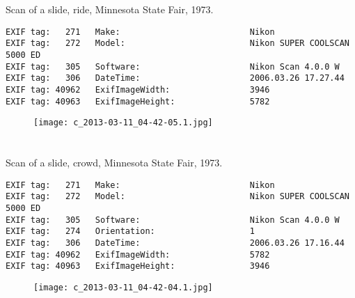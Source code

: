 \section{\protect{}}
\noindent Scan of a slide, ride, Minnesota State Fair, 1973.
\noindent
\begin{lstlisting}
EXIF tag:   271   Make:                          Nikon
EXIF tag:   272   Model:                         Nikon SUPER COOLSCAN 5000 ED
EXIF tag:   305   Software:                      Nikon Scan 4.0.0 W
EXIF tag:   306   DateTime:                      2006.03.26 17.27.44
EXIF tag: 40962   ExifImageWidth:                3946
EXIF tag: 40963   ExifImageHeight:               5782

\end{lstlisting}
\clearpage
\begin{figure}
\raggedleft
\texttt{[image: c\_2013-03-11\_04-42-05.1.jpg]}
\end{figure}


\clearpage
\section{\protect{}}
\noindent Scan of a slide, crowd, Minnesota State Fair, 1973.
\noindent
\begin{lstlisting}
EXIF tag:   271   Make:                          Nikon
EXIF tag:   272   Model:                         Nikon SUPER COOLSCAN 5000 ED
EXIF tag:   305   Software:                      Nikon Scan 4.0.0 W
EXIF tag:   274   Orientation:                   1
EXIF tag:   306   DateTime:                      2006.03.26 17.16.44
EXIF tag: 40962   ExifImageWidth:                5782
EXIF tag: 40963   ExifImageHeight:               3946

\end{lstlisting}
\clearpage
\begin{figure}
\raggedleft
\texttt{[image: c\_2013-03-11\_04-42-04.1.jpg]}
\end{figure}


\clearpage
